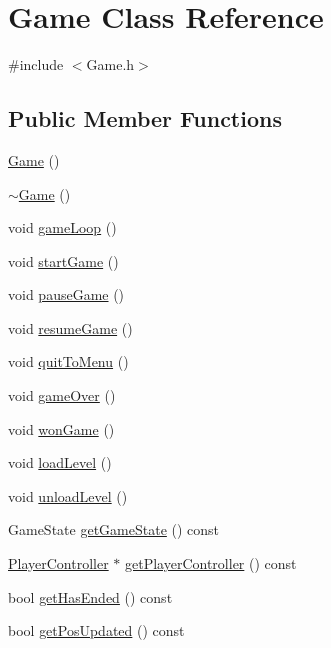 \hypertarget{class_game}{}\section{Game Class Reference}
\label{class_game}


{\ttfamily \#include $<$Game.\+h$>$}

\subsection*{Public Member Functions}
\begin{DoxyCompactItemize}
\item 
\hyperlink{class_game_ad59df6562a58a614fda24622d3715b65}{Game} ()
\item 
\hyperlink{class_game_ae3d112ca6e0e55150d2fdbc704474530}{$\sim$\+Game} ()
\item 
void \hyperlink{class_game_aede5f46c8c7bbbaf8459eeec397a11e7}{game\+Loop} ()
\item 
void \hyperlink{class_game_ae8638ccdb0ef3bf39a6affa30aa1258f}{start\+Game} ()
\item 
void \hyperlink{class_game_a9d9a79a0f7df3c7e55a3103c04ecbc87}{pause\+Game} ()
\item 
void \hyperlink{class_game_a5ec2daf2a7fe95ee03dea84b4f5d6883}{resume\+Game} ()
\item 
void \hyperlink{class_game_a1b49fd5de3fab7b261174eeb8d3821d6}{quit\+To\+Menu} ()
\item 
void \hyperlink{class_game_ac7d371f3f30513a4f3c57f521fac9b5f}{game\+Over} ()
\item 
void \hyperlink{class_game_acc4dda5b606488c41b49f0d4aeb62c72}{won\+Game} ()
\item 
void \hyperlink{class_game_a9713f011d2d0d3ef4a37aa07d7951947}{load\+Level} ()
\item 
void \hyperlink{class_game_a2ab6e00f11b050df95fdbb5750a535b2}{unload\+Level} ()
\item 
Game\+State \hyperlink{class_game_ac9317693584f31dd51f12e0fa84a1233}{get\+Game\+State} () const 
\item 
\hyperlink{class_player_controller}{Player\+Controller} $\ast$ \hyperlink{class_game_a5b06e73254230e5dcdea6b1e779db6c3}{get\+Player\+Controller} () const 
\item 
bool \hyperlink{class_game_a5280c36f5826f143b70aa3be87fb93ac}{get\+Has\+Ended} () const 
\item 
bool \hyperlink{class_game_acb5fc51d587af62960f5b29bdf294b4f}{get\+Pos\+Updated} () const 

\end{DoxyCompactItemize}
